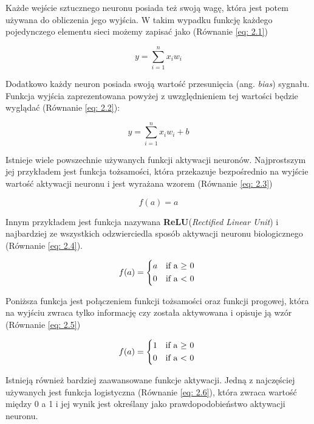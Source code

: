 \documentclass[12pt, oneside, a4paper]{report}
\begin{document}
Każde wejście sztucznego neuronu posiada też swoją wagę, która jest potem używana do obliczenia jego wyjścia. W takim wypadku funkcję każdego pojedynczego elementu sieci możemy zapisać jako (Równanie \ref{eq: 2.1})

\begin{equation}\label{eq: 2.1}
y = \sum^{n}_{i=1} x_{i}w_{i}
\end{equation}

Dodatkowo każdy neuron posiada swoją wartość przesunięcia (ang. \textit{bias}) sygnału. Funkcja wyjścia zaprezentowana powyżej z uwzględnieniem tej wartości będzie wyglądać (Równanie \ref{eq: 2.2}):

\begin{equation}\label{eq: 2.2}
  y = \sum^{n}_{i=1} x_{i}w_{i} + b
\end{equation}

Istnieje wiele powszechnie używanych funkcji aktywacji neuronów. Najprostszym jej przykładem jest funkcja tożsamości, która przekazuje bezpośrednio na wyjście wartość aktywacji neuronu i jest wyrażana wzorem (Równanie \ref{eq: 2.3})

\begin{equation}\label{eq: 2.3}
  f(a) = a
\end{equation}

Innym przykładem jest funkcja nazywana \textbf{ReLU}(\textit{Rectified Linear Unit}) i najbardziej ze wszystkich odzwierciedla sposób aktywacji neuronu biologicznego (Równanie \ref{eq: 2.4}).

\begin{equation}\label{eq: 2.4}
    f(a) =
    \begin{cases*}
      a & if a $\geq$ 0 \\
      0 & if a < 0
    \end{cases*}
\end{equation}

Poniższa funkcja jest połączeniem funkcji tożsamości oraz funkcji progowej, która na wyjściu zwraca tylko informację czy została aktywowana i opisuje ją wzór (Równanie \ref{eq: 2.5})

\begin{equation}\label{eq: 2.5}
  f(a) =
  \begin{cases*}
    1 & if a $\geq$ 0 \\
    0 & if a < 0
  \end{cases*}
\end{equation}

Istnieją również bardziej zaawansowane funkcje aktywacji. Jedną z najczęściej używanych jest funkcja logistyczna (Równanie \ref{eq: 2.6}), która zwraca wartość między 0 a 1 i jej wynik jest określany jako prawdopodobieństwo aktywacji neuronu.
\end{document}
